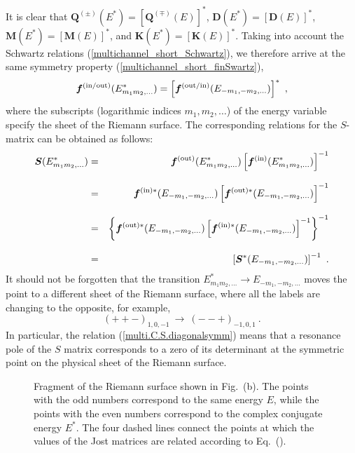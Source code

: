 \documentclass[12pt]{article}
\begin{document}
It is clear that
   $\bm{Q}^{(\pm)}(E^*)=\left[\bm{Q}^{(\mp)}(E)\right]^*$,
   $\bm{D}(E^*)=\left[\bm{D}(E)\right]^*$,
   $\bm{M}(E^*)=\left[\bm{M}(E)\right]^*$,   
   and
   $\bm{K}(E^*)=\left[\bm{K}(E)\right]^*$. 
Taking into account the Schwartz relations (\ref{multichannel_short_Schwartz}), 
we therefore arrive at the same symmetry 
property (\ref{multichannel_short_finSwartz}),
\begin{equation}
\label{multichannel_Coul_finSwartz}
   \bm{f}^{\rm(in/out)}(E^*_{m_1m_2,\dots})=
   \left[\bm{f}^{\rm(out/in)}(E_{-m_1,-m_2,\dots})\right]^*\ ,
\end{equation}
where the subscripts (logarithmic indices $m_1,m_2,\dots$) of the energy 
variable specify the sheet of the Riemann surface. 
The corresponding relations 
for the $S$-matrix  can be obtained as follows:
\begin{eqnarray}
\nonumber
   \bm{S}(E^*_{m_1m_2,\dots})
   &=&
   \bm{f}^{\rm(out)}(E^*_{m_1m_2,\dots})
   \left[\bm{f}^{\rm(in)}(E^*_{m_1m_2,\dots})\right]^{-1}\\[3mm]
\nonumber
   &=&
   \bm{f}^{\rm(in)*}(E_{-m_1,-m_2,\dots})
   \left[\bm{f}^{\rm(out)*}(E_{-m_1,-m_2,\dots})\right]^{-1}\\[3mm]
\nonumber
   &=&
   \left\{
   \bm{f}^{\rm(out)*}(E_{-m_1,-m_2,\dots})
   \left[\bm{f}^{\rm(in)*}(E_{-m_1,-m_2,\dots})\right]^{-1}
   \right\}^{-1}\\[3mm]
\label{multi.C.S.diagonalsymm}   
   &=&
   \left[\bm{S}^*(E_{-m_1,-m_2,\dots})\right]^{-1}\ .
\end{eqnarray}
It should not be forgotten that the transition 
$E^*_{m_1m_2,\dots}\to E_{-m_1,-m_2,\dots}$ moves the point to a different 
sheet of the Riemann surface, where all the labels are changing to the 
opposite, for example,
$$
   (++-)_{1,0,-1}\ \to\ (--+)_{-1,0,1}\ .
$$
In particular, the relation (\ref{multi.C.S.diagonalsymm}) means that a 
resonance pole of the $S$ matrix corresponds to a zero of its determinant at 
the symmetric point on the physical sheet of the Riemann surface.

\begin{figure}
\centerline{}
\caption{\sf
Fragment of the Riemann surface shown in 
Fig.~\protect{\ref{fig.sheets_2ch_Coulomb}}(b). The points with the odd numbers 
correspond to the same energy $E$, while the points with the even numbers 
correspond to the complex conjugate energy $E^*$.
The four dashed lines connect the points at which the values of the Jost 
matrices are related according to 
Eq.~(\protect{\ref{multichannel_Coul_finSwartz}}).
}
\label{fig.sheets_2ch_Coulomb_fragment_1m}
\end{figure}
\end{document}
